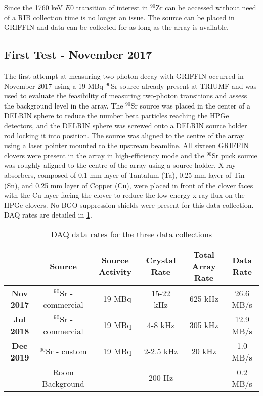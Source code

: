 \documentclass[cnatzke_thesis_proposal.tex]{subfiles}
\begin{document}
Since the 1760 keV $E0$ transition of interest in $^{90}$Zr can be accessed without need of a RIB collection time is no longer an issue.
The source can be placed in GRIFFIN and data can be collected for as long as the array is available. 

\subsection{First Test - November 2017}
The first attempt at measuring two-photon decay with GRIFFIN occurred in November 2017 using a 19 MBq $^{90}$Sr source already present at TRIUMF and was used to evaluate the feasibility of measuring two-photon transitions and assess the background level in the array.
The $^{90}$Sr source was placed in the center of a DELRIN sphere to reduce the number beta particles reaching the HPGe detectors, and the DELRIN sphere was screwed onto a DELRIN source holder rod locking it into position.
The source was aligned to the centre of the array using a laser pointer mounted to the upstream beamline.
All sixteen GRIFFIN clovers were present in the array in high-efficiency mode and the $^{90}$Sr puck source was roughly aligned to the centre of the array using a source holder.
X-ray absorbers, composed of 0.1 mm layer of Tantalum (Ta), 0.25 mm layer of Tin (Sn), and 0.25 mm layer of Copper (Cu), were placed in front of the clover faces with the Cu layer facing the clover to reduce the low energy x-ray flux on the HPGe clovers.
No BGO suppression shields were present for this data collection. 
DAQ rates are detailed in \ref{tab:daq_rates}.

\begin{table}[]
  \centering
  \begin{tabular}{cccccc}
                    & Source                  & Source Activity & Crystal Rate & Total Array Rate & Data Rate \\ \hline
  \textbf{Nov 2017} & $^{90}$Sr - commercial  & ~19 MBq         & 15-22 kHz    & 625 kHz          & 26.6 MB/s \\ \hline
  \textbf{Jul 2018} & $^{90}$Sr - commercial  & ~19 MBq         & 4-8 kHz      & 305 kHz          & 12.9 MB/s \\ \hline
  \textbf{Dec 2019} & $^{90}$Sr - custom      & ~19 MBq         & 2-2.5 kHz    & 20 kHz           & 1.0 MB/s  \\
                    & Room Background         & -               & 200 Hz       & -                & 0.2 MB/s  \\ \hline
  \end{tabular}
  \caption{DAQ data rates for the three data collections}
  \label{tab:daq_rates}
\end{table}
\end{document}
